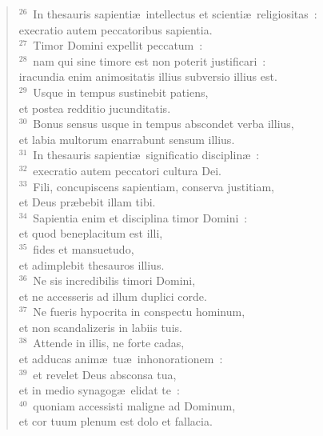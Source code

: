 \begin{verse}
${}^{26}$~In thesauris sapienti\ae\ intellectus et scienti\ae\ religiositas~:\\ execratio autem peccatoribus sapientia.\\
${}^{27}$~Timor Domini expellit peccatum~:\\
${}^{28}$~nam qui sine timore est non poterit justificari~:\\ iracundia enim animositatis illius subversio illius est.\\
${}^{29}$~Usque in tempus sustinebit patiens,\\ et postea redditio jucunditatis.\\
${}^{30}$~Bonus sensus usque in tempus abscondet verba illius,\\ et labia multorum enarrabunt sensum illius.\\
${}^{31}$~In thesauris sapienti\ae\ significatio disciplin\ae~:\\
${}^{32}$~execratio autem peccatori cultura Dei.\\
${}^{33}$~Fili, concupiscens sapientiam, conserva justitiam,\\ et Deus pr\ae bebit illam tibi.\\
${}^{34}$~Sapientia enim et disciplina timor Domini~:\\ et quod beneplacitum est illi,\\
${}^{35}$~fides et mansuetudo,\\ et adimplebit thesauros illius.\\
${}^{36}$~Ne sis incredibilis timori Domini,\\ et ne accesseris ad illum duplici corde.\\
${}^{37}$~Ne fueris hypocrita in conspectu hominum,\\ et non scandalizeris in labiis tuis.\\
${}^{38}$~Attende in illis, ne forte cadas,\\ et adducas anim\ae\ tu\ae\ inhonorationem~:\\
${}^{39}$~et revelet Deus absconsa tua,\\ et in medio synagog\ae\ elidat te~:\\
${}^{40}$~quoniam accessisti maligne ad Dominum,\\ et cor tuum plenum est dolo et fallacia.\end{verse}


